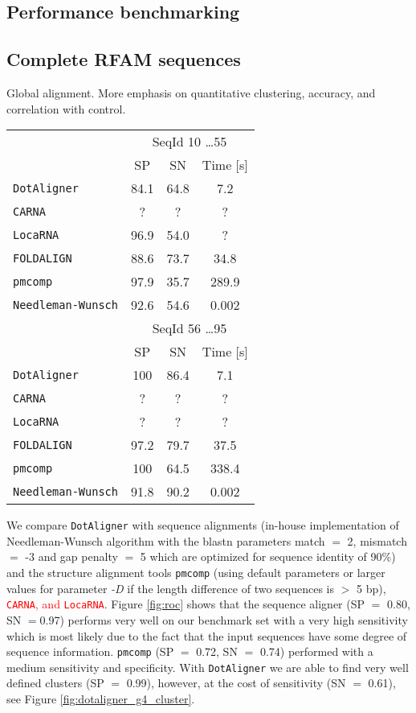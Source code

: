\documentclass[a4paper,twoside]{article}
\newcommand\dotaligner{\texttt{DotAligner}}
\newcommand\pmcomp{\texttt{pmcomp}}
\newcommand\locarna{\texttt{LocaRNA}}
\newcommand\foldalign{\texttt{FOLDALIGN}}
\newcommand\carna{\texttt{CARNA}}
\newcommand\nw{\texttt{Needleman-Wunsch}}
\newcommand{\RED}[1]{\textcolor{red}{#1}}
\newcommand{\GRAY}[1]{\textcolor{mygray}{#1}}
\begin{document}
\subsection{Performance benchmarking} 




\subsection{Complete RFAM sequences}

Global alignment. More emphasis on quantitative clustering, accuracy, and
correlation with control. 

\begin{tabular}{|l|c|c|c|}
\hline 
 & \multicolumn{3}{c|}{SeqId 10 \ldots 55} \\
 & SP & SN & Time [s] \\ 
\hline 
\dotaligner & 84.1 & 64.8 & 7.2 \\ 
\carna & ? & ? & ? \\ 
\locarna & 96.9 & 54.0 & ? \\ 
\foldalign & 88.6 & 73.7 & 34.8 \\ 
\pmcomp & 97.9 & 35.7 & 289.9 \\ 
\nw & 92.6 & 54.6 & 0.002 \\
\hline 
\hline 
 & \multicolumn{3}{c|}{SeqId 56 \ldots 95} \\
 & SP & SN & Time [s] \\ 
\dotaligner & 100 & 86.4 & 7.1 \\ 
\carna & ? & ? & ? \\ 
\locarna & ? & ? & ? \\ 
\foldalign & 97.2 & 79.7 & 37.5 \\ 
\pmcomp & 100 & 64.5 & 338.4 \\ 
\nw & 91.8 & 90.2 & 0.002 \\
\hline 
\end{tabular} 

\GRAY{We compare \dotaligner{} with sequence alignments (in-house
implementation of Needleman-Wunsch algorithm with the blastn parameters match
$=$ 2, mismatch $=$ -3 and gap penalty $=$ 5 which are optimized for sequence
identity of 90\%) and the structure alignment tools \pmcomp{} (using default
parameters or larger values for parameter \emph{-D} if the length difference of
two sequences is $>$ 5 bp), \RED{\carna, and \locarna}. Figure \ref{fig:roc}
shows that the sequence aligner (SP $=$ 0.80, SN $=$0.97) performs very well on
our benchmark set with a very high sensitivity which is most likely due to the
fact that the input sequences have some degree of sequence information.
\pmcomp{} (SP $=$ 0.72, SN $=$ 0.74) performed with a medium sensitivity and
specificity. With \dotaligner{} we are able to find very well defined clusters (SP
$=$ 0.99), however, at the cost of sensitivity (SN $=$ 0.61), see Figure
\ref{fig:dotaligner_g4_cluster}.}
\end{document}
